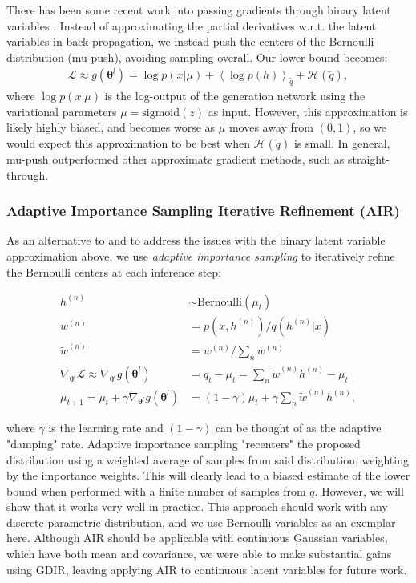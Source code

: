 \documentclass{article} %
\newcommand{\qexp}[1]{\left<#1\right>}
\newcommand{\vects}[1]{\boldsymbol{#1}}
\newcommand{\TT}[0]{\vects{\theta}}
\newcommand{\grad}[0]{\nabla}
\newcommand{\LL}[0]{\mathcal{L}}
\newcommand{\HH}[0]{\mathcal{H}}
\newcommand{\sigmoid}{\text{sigmoid}}
\newcommand{\Bernoulli}{\text{Bernoulli}}
\begin{document}
There has been some recent work into passing gradients through binary latent
variables \citep{bengio2013estimating}. Instead of approximating the partial
derivatives w.r.t. the latent variables in back-propagation, we instead push the
centers of the Bernoulli distribution (mu-push), avoiding sampling overall. Our lower
bound becomes:
\begin{align}
     \LL \approx g(\TT^l) = \log p(x | \mu) + \qexp{\log p(h)}_{\tilde{q}} +
     \HH(\tilde{q}),
\end{align}
where $\log p(x | \mu)$ is the log-output of the generation network using the
variational parameters $\mu = \sigmoid(z)$ as input. However, this approximation
is likely highly biased, and becomes worse as $\mu$ moves away from $(0, 1)$, so
we would expect this approximation to be best when $\HH(\tilde{q})$ is small. In general, mu-push outperformed other approximate gradient methods, such as straight-through.

\subsubsection{Adaptive Importance Sampling Iterative Refinement (AIR)}
As an alternative to and to address the issues with the binary latent variable approximation above, we use \emph{adaptive importance sampling} \citep[AdIS,][]{oh1992adaptive} to iteratively refine the Bernoulli centers at each inference step:

\begin{align}
    h^{(n)} &\sim \Bernoulli(\mu_t) \nonumber \\
w^{(n)} &= p(x, h^{(n)}) / q(h^{(n)} | x) \nonumber \\
\tilde{w}^{(n)} &= w^{(n)} / \sum_n w^{(n)} \nonumber \\
\grad_{\TT^l} \LL \approx \grad_{\TT^l} g(\TT^l) &= q_t - \mu_t  = \sum_n \tilde{w}^{(n)} h^{(n)} - \mu_t  \nonumber\\
\mu_{t+1} = \mu_t + \gamma \grad_{\TT^l} g(\TT^l) &= (1 - \gamma) \mu_t + \gamma \sum_n \tilde{w}^{(n)} h^{(n)},
\end{align}

where $\gamma$ is the learning rate and $(1 - \gamma)$ can be thought of as the adaptive "damping" rate. Adaptive importance sampling "recenters" the proposed distribution using a weighted average of samples from said distribution, weighting by the importance weights. This will clearly lead to a biased estimate of the lower bound when performed with a finite number of samples from $\tilde{q}$. However, we will show that it works very well in practice. This approach should work with any discrete parametric distribution, and we use Bernoulli variables as an exemplar here. Although AIR should be applicable with continuous Gaussian variables, which have both mean and covariance, we were able to make substantial gains using GDIR, leaving applying AIR to continuous latent variables for future work.
\end{document}
